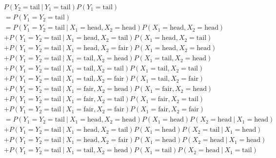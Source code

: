 \begin{solution}
\begin{enumerate}[label = (\alph*)]
    \begin{align*}
        &
        P(Y_2 = \mathrm{tail} ~|~ Y_1 = \mathrm{tail}) P(Y_1 = \mathrm{tail}) \\
        & =
        P(Y_1 = Y_2 = \mathrm{tail}) \\
        & =
        P(Y_1 = Y_2 = \mathrm{tail} ~|~ X_1 = \mathrm{head}, X_2 = \mathrm{head}) P(X_1 = \mathrm{head}, X_2 = \mathrm{head}) \\
        & +
        P(Y_1 = Y_2 = \mathrm{tail} ~|~ X_1 = \mathrm{head}, X_2 = \mathrm{tail}) P(X_1 = \mathrm{head}, X_2 = \mathrm{tail}) \\
        & +
        P(Y_1 = Y_2 = \mathrm{tail} ~|~ X_1 = \mathrm{head}, X_2 = \mathrm{fair}) P(X_1 = \mathrm{head}, X_2 = \mathrm{head}) \\
        & +
        P(Y_1 = Y_2 = \mathrm{tail} ~|~ X_1 = \mathrm{tail}, X_2 = \mathrm{head}) P(X_1 = \mathrm{tail}, X_2 = \mathrm{head}) \\
        & +
        P(Y_1 = Y_2 = \mathrm{tail} ~|~ X_1 = \mathrm{tail}, X_2 = \mathrm{tail}) P(X_1 = \mathrm{tail}, X_2 = \mathrm{tail}) \\
        & +
        P(Y_1 = Y_2 = \mathrm{tail} ~|~ X_1 = \mathrm{tail}, X_2 = \mathrm{fair}) P(X_1 = \mathrm{tail}, X_2 = \mathrm{fair}) \\
        & +
        P(Y_1 = Y_2 = \mathrm{tail} ~|~ X_1 = \mathrm{fair}, X_2 = \mathrm{head}) P(X_1 = \mathrm{fair}, X_2 = \mathrm{head}) \\
        & +
        P(Y_1 = Y_2 = \mathrm{tail} ~|~ X_1 = \mathrm{fair}, X_2 = \mathrm{tail}) P(X_1 = \mathrm{fair}, X_2 = \mathrm{tail}) \\
        & +
        P(Y_1 = Y_2 = \mathrm{tail} ~|~ X_1 = \mathrm{fair}, X_2 = \mathrm{fair}) P(X_1 = \mathrm{fair}, X_2 = \mathrm{fair}) \\
        & =
        P(Y_1 = Y_2 = \mathrm{tail} ~|~ X_1 = \mathrm{head}, X_2 = \mathrm{head}) P(X_1 = \mathrm{head}) P(X_2 = \mathrm{head} ~|~ X_1 = \mathrm{head}) \\
        & +
        P(Y_1 = Y_2 = \mathrm{tail} ~|~ X_1 = \mathrm{head}, X_2 = \mathrm{tail}) P(X_1 = \mathrm{head}) P(X_2 = \mathrm{tail} ~|~ X_1 = \mathrm{head}) \\
        & +
        P(Y_1 = Y_2 = \mathrm{tail} ~|~ X_1 = \mathrm{head}, X_2 = \mathrm{fair}) P(X_1 = \mathrm{head}) P(X_2 = \mathrm{head} ~|~ X_1 = \mathrm{head}) \\
        & +
        P(Y_1 = Y_2 = \mathrm{tail} ~|~ X_1 = \mathrm{tail}, X_2 = \mathrm{head}) P(X_1 = \mathrm{tail}) P(X_2 = \mathrm{head} ~|~ X_1 = \mathrm{tail}) \\

\end{align*}
\end{enumerate}
\end{solution}
